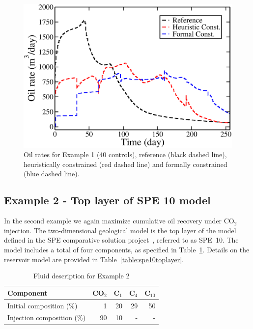 \begin{figure}
\begin{center}
\includegraphics[totalheight=2.2in,angle=0]{figures/OilRatesSteps8.pdf}
\end{center}
\caption{Oil rates for Example 1 (40 controls), reference (black dashed line), heuristically constrained (red dashed line)
 and formally constrained (blue dashed line).} 
\label{fig:PIOilRates}
\end{figure}





\subsection{Example 2 - Top layer of SPE 10 model}
%
In the second example we again maximize cumulative oil recovery under CO$_2$
injection. The two-dimensional geological model is the top layer of the model
defined in the SPE comparative solution project~\cite{Christie}, referred to as
SPE~10. The model includes a total of four components, as specified in
Table~\ref{table:fluidForSPE10TopLayer}. Details on the
reservoir model are provided in
Table~\ref{table:spe10toplayer}.

%
\begin{table}
\centering
\caption{Fluid description for Example 2}
\begin{tabular}{|l|r|r|r|r|}
\hline
Component            & CO$_2$ & C$_1$ & C$_4$ & C$_{10}$    \\
\hline
Initial composition (\%)  & 1    & 20  & 29    & 50 \\
Injection composition (\%)& 90   & 10 & - & - \\
\hline
\end{tabular}
\label{table:fluidForSPE10TopLayer}
\end{table}
%


